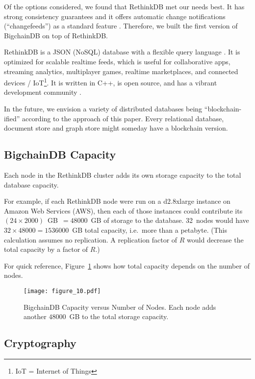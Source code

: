 Of the options considered, we found that RethinkDB met our needs best.
It has strong consistency guarantees \cite{rethinkdb_consistency} and it offers automatic change notifications (“changefeeds”) as a standard feature \cite{rethinkdb_changefeeds}.
Therefore, we built the first version of BigchainDB on top of RethinkDB.

RethinkDB is a JSON (NoSQL) database with a flexible query language \cite{rethinkdb_faq}.
It is optimized for scalable realtime feeds, which is useful for collaborative apps, streaming analytics, multiplayer games, realtime marketplaces, and connected devices / IoT\footnote{IoT = Internet of Things}.
It is written in C++, is open source, and has a vibrant development community \cite{rethinkdb_github}.

In the future, we envision a variety of distributed databases being “blockchain-ified” according to the approach of this paper.
Every relational database, document store and graph store might someday have a blockchain version.


\subsection{BigchainDB Capacity}

Each node in the RethinkDB cluster adds its own storage capacity to the total database capacity.

For example, if each RethinkDB node were run on a d2.8xlarge instance on Amazon Web Services (AWS), then each of those instances could contribute its $(24 \times 2000)$~GB~$= 48000$~GB of storage to the database. 32~nodes would have $32 \times 48000 = 1536000$~GB total capacity, i.e.~more than a petabyte. (This calculation assumes no replication. A replication factor of $R$ would decrease the total capacity by a factor of $R$.)

For quick reference, Figure~\ref{fig:bigchain_capacity_vs_nodes} shows how total capacity depends on the number of nodes. 

\begin{figure}[!ht]
  \centering
  \texttt{[image: figure\_10.pdf]}
  \caption{BigchainDB Capacity versus Number of Nodes. Each node adds another $48000$~GB to the total storage capacity.}
  \label{fig:bigchain_capacity_vs_nodes}
\end{figure}

\subsection{Cryptography}

